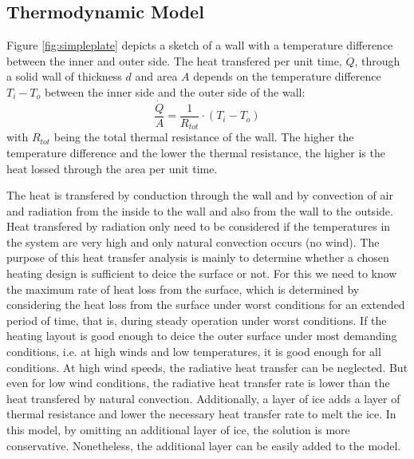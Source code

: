 \subsection{Thermodynamic Model}\label{chapter:basics}
Figure \ref{fig:simpleplate} depicts a sketch of a wall with a temperature difference between the inner and outer side. The heat transfered per unit time, \(\dot Q\), through a solid wall of thickness \(d\) and area \(A\) depends on the temperature difference \(T_i - T_o\) between the inner side and the outer side of the wall:
\begin{equation}
\frac{\dot Q}{A} =  \frac{1}{R_{tot}}\cdot (T_i - T_o)
\end{equation}
with \(R_{tot}\) being the total thermal resistance of the wall. The higher the temperature difference and the lower the thermal resistance, the higher is the heat lossed through the area per unit time. 

The heat is transfered by conduction through the wall and by convection of air and radiation from the inside to the wall and also from the wall to the outside. Heat transfered by radiation only need to be considered if the temperatures in the system are very high and only natural convection occurs (no wind). The purpose of this heat transfer analysis is mainly to determine whether a chosen heating design is sufficient to deice the surface or not. For this we need to know the maximum rate of heat loss from the surface, which is determined by considering the heat loss from the surface under worst conditions for an extended period of time, that is, during steady operation under worst conditions. If the heating layout is good enough to deice the outer surface under most demanding conditions, i.e. at high winds and low temperatures, it is good enough for all conditions. At high wind speeds, the radiative heat transfer can be neglected. But even for low wind conditions, the radiative heat transfer rate is lower than the heat transfered by natural convection. Additionally, a layer of ice adds a layer of thermal resistance and lower the necessary heat transfer rate to melt the ice. In this model, by omitting an additional layer of ice, the solution is more conservative. Nonetheless, the additional layer can be easily added to the model.

